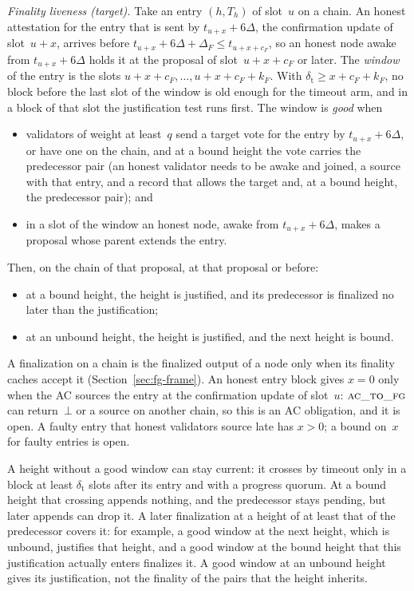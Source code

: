 \documentclass{article}
\newcommand{\fname}[1]{\text{\textsc{#1}}}
\begin{document}
\emph{Finality liveness (target).}  Take an entry $(h,T_h)$ of slot~$u$
on a chain.  An honest attestation for the entry that is sent by
$t_{u+x}+6\Delta$, the confirmation update of slot~$u+x$, arrives
before $t_{u+x}+6\Delta+\Delta_F\leq t_{u+x+c_F}$, so an honest
node awake from $t_{u+x}+6\Delta$ holds it at the proposal of
slot~$u+x+c_F$ or later.  The \emph{window} of the entry is the slots
$u+x+c_F,\ldots,u+x+c_F+k_F$.  With
$\delta_{\mathrm{t}}\geq x+c_F+k_F$, no block before the last slot of the
window is old enough for the timeout arm, and in a block of that slot the
justification test runs first.  The window is \emph{good} when
\begin{itemize}
\item validators of weight at least~$q$ send a target vote for the entry
  by $t_{u+x}+6\Delta$, or have one on the chain, and at a bound height
  the vote carries the predecessor pair (an honest validator needs to be
  awake and joined, a source with that entry, and a record that allows the
  target and, at a bound height, the predecessor pair); and
\item in a slot of the window an honest node, awake from
  $t_{u+x}+6\Delta$, makes a proposal whose parent extends the entry.
\end{itemize}
Then, on the chain of that proposal, at that proposal or before:
\begin{itemize}
\item at a bound height, the height is justified, and its predecessor is
  finalized no later than the justification;
\item at an unbound height, the height is justified, and the next height
  is bound.
\end{itemize}
A finalization on a chain is the finalized output of a node only when its
finality caches accept it (Section~\ref{sec:fg-frame}).  An honest entry
block gives $x=0$ only when the AC sources the entry at the confirmation
update of slot~$u$: $\fname{ac\_to\_fg}$ can return~$\bot$ or a source
on another chain, so this is an AC obligation, and it is open.  A faulty
entry that honest validators source late has $x>0$; a bound on~$x$ for
faulty entries is open.

A height without a good window can stay current: it crosses by timeout
only in a block at least $\delta_{\mathrm{t}}$ slots after its entry and
with a progress quorum.  At a bound height that crossing appends nothing,
and the predecessor stays pending, but later appends can drop it.  A
later finalization at a height of at least that of the predecessor covers
it: for example, a good window at the next height, which is unbound,
justifies that height, and a good window at the bound height that this
justification actually enters finalizes it.  A good window at an unbound
height gives its justification, not the finality of the pairs that the
height inherits.
\end{document}
